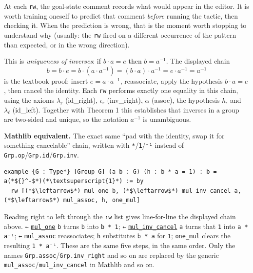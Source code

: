 At each \texttt{rw}, the goal-state comment records what would appear in the editor. It is worth training oneself to predict that comment \emph{before} running the tactic, then checking it. When the prediction is wrong, that is the moment worth stopping to understand why (usually: the \texttt{rw} fired on a different occurrence of the pattern than expected, or in the wrong direction).

\begin{mathreading}

This is \emph{uniqueness of inverses}: if \(b\cdot a = e\) then \(b = a^{-1}\). The displayed chain \[
b = b\cdot e = b\cdot(a\cdot a^{-1}) = (b\cdot a)\cdot a^{-1} = e\cdot a^{-1}
= a^{-1}
\] is the textbook proof: insert \(e = a\cdot a^{-1}\), reassociate, apply the hypothesis \(b\cdot a = e\), then cancel the identity. Each \texttt{rw} performs exactly one equality in this chain, using the axioms \(\lambda_r\) (id\_right), \(\iota_r\) (inv\_right), \(\alpha\) (assoc), the hypothesis \(h\), and \(\lambda_\ell\) (id\_left). Together with Theorem 1 this establishes that inverses in a group are two-sided and unique, so the notation \(a^{-1}\) is unambiguous.

\end{mathreading}

\textbf{Mathlib equivalent.} The exact same ``pad with the identity, swap it for something cancelable'' chain, written with \texttt{*}/\texttt{1}/\texttt{⁻¹} instead of \texttt{Grp.op}/\texttt{Grp.id}/\texttt{Grp.inv}.

\begin{lstlisting}
example {G : Type*} [Group G] (a b : G) (h : b * a = 1) : b = a(*${}^-$*)(*\textsuperscript{1}*) := by
  rw [(*$\leftarrow$*) mul_one b, (*$\leftarrow$*) mul_inv_cancel a, (*$\leftarrow$*) mul_assoc, h, one_mul]
\end{lstlisting}

Reading right to left through the \texttt{rw} list gives line-for-line the displayed chain above. \texttt{←} \href{https://loogle.lean-lang.org/?q=mul_one}{\texttt{mul\_\allowbreak{}one}} \texttt{b} turns \texttt{b} into \texttt{b * 1}; \texttt{←} \href{https://loogle.lean-lang.org/?q=mul_inv_cancel}{\texttt{mul\_\allowbreak{}inv\_\allowbreak{}cancel}} \texttt{a} turns that \texttt{1} into \texttt{a * a⁻¹}; \texttt{←} \href{https://loogle.lean-lang.org/?q=mul_assoc}{\texttt{mul\_\allowbreak{}assoc}} reassociates; \texttt{h} substitutes \texttt{b * a} for \texttt{1}; \href{https://loogle.lean-lang.org/?q=one_mul}{\texttt{one\_\allowbreak{}mul}} clears the resulting \texttt{1 * a⁻¹}. These are the same five steps, in the same order. Only the names \texttt{Grp.assoc}/\texttt{Grp.inv\_\allowbreak{}right} and so on are replaced by the generic \texttt{mul\_\allowbreak{}assoc}/\texttt{mul\_\allowbreak{}inv\_\allowbreak{}cancel} in Mathlib and so on.
